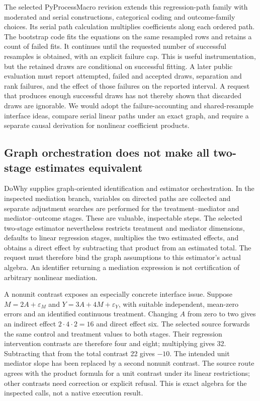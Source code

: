 The selected PyProcessMacro revision extends this regression-path family with moderated and serial constructions, categorical coding and outcome-family choices. Its serial path calculation multiplies coefficients along each ordered path. The bootstrap code fits the equations on the same resampled rows and retains a count of failed fits. It continues until the requested number of successful resamples is obtained, with an explicit failure cap. This is useful instrumentation, but the retained draws are conditional on successful fitting. A later public evaluation must report attempted, failed and accepted draws, separation and rank failures, and the effect of those failures on the reported interval. A request that produces enough successful draws has not thereby shown that discarded draws are ignorable. We would adopt the failure-accounting and shared-resample interface ideas, compare serial linear paths under an exact graph, and require a separate causal derivation for nonlinear coefficient products.\cite{exec25_pymed_process,exec25_pymed_choice}

\subsection{Graph orchestration does not make all two-stage estimates equivalent}
DoWhy supplies graph-oriented identification and estimator orchestration. In the inspected mediation branch, variables on directed paths are collected and separate adjustment searches are performed for the treatment--mediator and mediator--outcome stages. These are valuable, inspectable steps. The selected two-stage estimator nevertheless restricts treatment and mediator dimensions, defaults to linear regression stages, multiplies the two estimated effects, and obtains a direct effect by subtracting that product from an estimated total. The request must therefore bind the graph assumptions to this estimator's actual algebra. An identifier returning a mediation expression is not certification of arbitrary nonlinear mediation.\cite{exec25_pymed_dowhy}

A nonunit contrast exposes an especially concrete interface issue. Suppose $M=2A+\varepsilon_M$ and $Y=3A+4M+\varepsilon_Y$, with suitable independent, mean-zero errors and an identified continuous treatment. Changing $A$ from zero to two gives an indirect effect $2\cdot4\cdot2=16$ and direct effect six. The selected source forwards the same control and treatment values to both stages. Their regression intervention contrasts are therefore four and eight; multiplying gives 32. Subtracting that from the total contrast 22 gives $-10$. The intended unit mediator slope has been replaced by a second nonunit contrast. The source route agrees with the product formula for a unit contrast under its linear restrictions; other contrasts need correction or explicit refusal. This is exact algebra for the inspected calls, not a native execution result.\cite{exec25_pymed_dowhy,exec25_pymed_choice}

